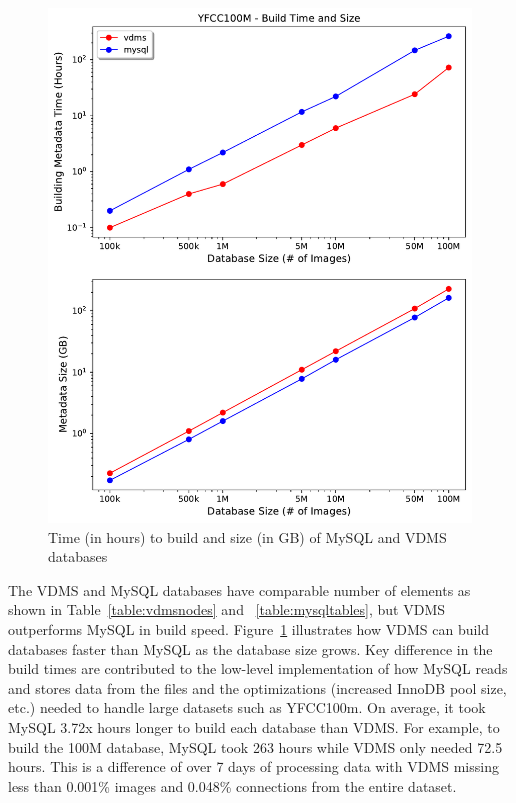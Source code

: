 \begin{figure}[]
\centering
\includegraphics[width=\columnwidth]{figures/db_time_size}
\caption{Time (in hours) to build and size (in GB) of MySQL and VDMS databases}
\label{fig:db_time_size}
\end{figure}

The VDMS and MySQL databases have comparable number of elements as shown in
Table~\ref{table:vdmsnodes} and ~\ref{table:mysqltables},
but VDMS outperforms MySQL in build speed.
Figure~\ref{fig:db_time_size} illustrates how VDMS can build databases
faster than MySQL as the database size grows.
Key difference in the build times are contributed to the low-level
implementation of how MySQL reads and stores data from the files and the
optimizations (increased InnoDB pool size, etc.) needed
to handle large datasets such as YFCC100m.
On average, it took MySQL 3.72x hours longer to build each database than VDMS.
For example, to build the 100M database, MySQL took 263 hours
while VDMS only needed 72.5 hours.
This is a difference of over 7 days of processing data with VDMS missing less
than 0.001\% images and 0.048\% connections from the entire dataset.


